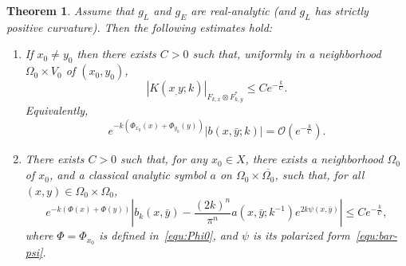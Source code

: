 \documentclass{article}
\newtheorem{theo}{Theorem}[section]
\newcommand{\abs}[1]{\left|#1\right|}
\begin{document}
\begin{theo}
  \label{theo:line-bundle}
  Assume that $g_L$ and $g_E$ are real-analytic (and $g_L$ has
  strictly positive curvature). Then the following estimates hold:
  \begin{enumerate}
  \item \label{item:off-diag} If $x_0\neq y_0$ then there exists $C>0$
    such that, uniformly in a neighborhood $\Omega_0\times V_0$ of
    $(x_0,y_0)$,
    \[
    \abs{K(x_,y;k)}_{F_{k,x}\otimes F_{k,y}^*} \leq Ce^{-\frac{k}{C}}
    .
    \]
    Equivalently,
    \[
    e^{-k(\Phi_{x_0}(x) + \Phi_{y_0}(y))}\abs{b(x,\bar y;k)} =
    \mathcal{O}(e^{-\frac{k}{C}}) .
    \]
  \item \label{item:near-diag} There exists $C>0$ such that, for any
    $x_0\in X$, there exists a neighborhood $\Omega_0$ of $x_0$, and a
    classical analytic symbol $a$ on
    $\Omega_0\times \overline{\Omega_0}$, such that, for all
    $(x,y)\in \Omega_0\times \Omega_0$,
    \[
    e^{-k(\Phi(x)+\Phi(y))}\abs{b_k(x,\bar y) - \frac{(2k)^n}{\pi^n}
      {a(x,\bar y;k^{-1})}e^{2k\psi(x,\bar y)}} \leq C
    e^{-\frac{k}{C}},
    \]
    where $\Phi=\Phi_{x_0}$ is defined in~\eqref{equ:Phi0}, and $\psi$
    is its polarized form~\eqref{equ:bar-psi}.
  \end{enumerate}
\end{theo}
\end{document}
